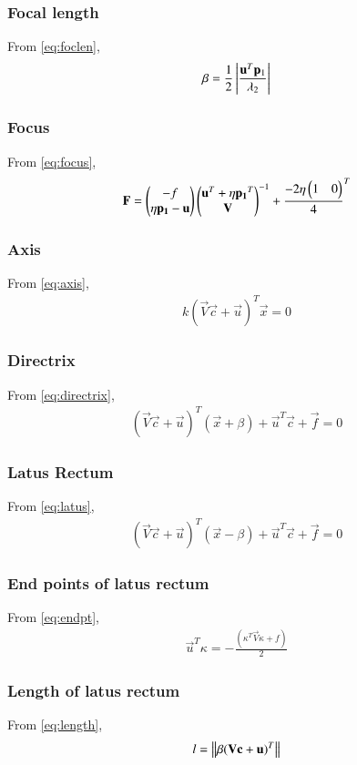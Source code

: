 \documentclass[journal,12pt,twocolumn]{IEEEtran}
\begin{document}
\subsubsection{Focal length}
From \eqref{eq:foclen},
\begin{align}
\beta = \frac{1}{2}\left\vert\frac{\mathbf{u}^T\mathbf{p}_1}{\lambda_2}\right\vert 
\end{align}
\subsubsection{Focus}
From \eqref{eq:focus},
\begin{align}
\mathbf{F} = \begin{pmatrix}-f \\ \eta\mathbf{p_1} - \mathbf{u}\end{pmatrix}{\ensuremath{\begin{pmatrix}\mathbf{u}^T + \eta\mathbf{p_1}^T \\ \mathbf{V}\end{pmatrix}}}^{-1} + {\frac{-2\eta\begin{pmatrix}1 & 0\end{pmatrix}}{4}}^{T} 
\end{align}
\subsubsection{Axis}
From \eqref{eq:axis},
\begin{align}
    k(\vec{V}\vec{c}+\vec{u})^{T}\vec{x} = 0 
\end{align}
\subsubsection{Directrix}
From \eqref{eq:directrix},
\begin{align}
    (\vec{V}\vec{c}+\vec{u})^T(\vec{x} +\beta) + \vec{u}^T\vec{c} + \vec{f} = 0
\end{align}
\subsubsection{Latus Rectum}
From \eqref{eq:latus},
\begin{align}
    (\vec{V}\vec{c}+\vec{u})^T(\vec{x} -\beta) + \vec{u}^T\vec{c} + \vec{f} = 0
\end{align}
\subsubsection{End points of latus rectum}
From \eqref{eq:endpt},
\begin{align}
    \vec{u}^T\kappa = -\frac{(\kappa^T\vec{V}\kappa + f )}{2}
\end{align}
\subsubsection{Length of latus rectum}
From \eqref{eq:length},
\begin{align}
   l=\left\lVert\beta(\mathbf{V}\mathbf{c}+\mathbf{u})^T\right\rVert 
\end{align}
\end{document}
